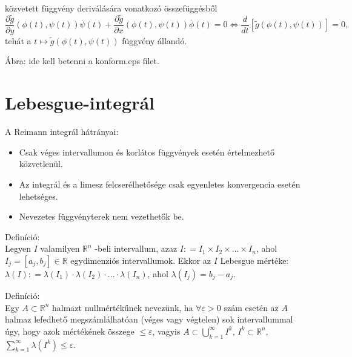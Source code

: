 \documentclass[12pt,a4paper]{scrartcl}
\providecommand{\tightlist}{%
  \setlength{\itemsep}{0pt}\setlength{\parskip}{0pt}}
\newenvironment{definicio}{}{}
\begin{document}
közvetett függvény deriválására vonatkozó összefüggésből
\[\left. \frac{\partial\widetilde{g}}{\partial y}\left( {\phi\left( t \right),\psi\left( t \right)} \right)\overset{.}{\psi}\left( t \right) + \frac{\partial\widetilde{g}}{\partial x}\left( {\phi\left( t \right),\psi\left( t \right)} \right)\overset{.}{\phi}\left( t \right) = 0\Leftrightarrow\frac{d}{dt}\left\lbrack {\widetilde{g}\left( {\phi\left( t \right),\psi\left( t \right)} \right)} \right\rbrack = 0, \right.\]
tehát a
\(\left. t\mapsto\widetilde{g}\left( {\phi\left( t \right),\psi\left( t \right)} \right) \right.\)
függvény állandó.

Ábra: ide kell betenni a konform.eps filet.

\hypertarget{lebesgue-integral}{%
\section{Lebesgue-integrál}\label{lebesgue-integral}}

A Reimann integrál hátrányai:

\begin{itemize}
\tightlist
\item
  Csak véges intervallumon és korlátos függvények esetén értelmezhető
  közvetlenül.
\item
  Az integrál és a limesz felcserélhetősége csak egyenletes konvergencia
  esetén lehetséges.
\item
  Nevezetes függvényterek nem vezethetők be.
\end{itemize}

\begin{definicio}

Definíció:\\
Legyen \(I\) valamilyen \({\mathbb{R}}^{n}\) -beli intervallum, azaz
\(I: = I_{1} \times I_{2} \times ... \times I_{n}\), ahol
\(I_{j} = \left\lbrack {a_{j},b_{j}} \right\rbrack \in {\mathbb{R}}\)
egydimenziós intervallumok. Ekkor az \(I\) Lebesgue mértéke:
\(\lambda\left( I \right): = \lambda\left( I_{1} \right) \cdot \lambda\left( I_{2} \right) \cdot ... \cdot \lambda\left( I_{n} \right)\),
ahol \(\lambda\left( I_{j} \right) = b_{j} - a_{j}\).

\end{definicio}

\begin{definicio}

Definíció:\\
Egy \(A \subset {\mathbb{R}}^{n}\) halmazt nullmértékűnek nevezünk, ha
\(\forall\varepsilon > 0\) szám esetén az \(A\) halmaz lefedhető
megszámlálhatóan (véges vagy végtelen) sok intervallummal úgy, hogy azok
mértékének összege \(\leq \varepsilon\), vagyis
\(A \subset {\bigcup\limits_{k = 1}^{\infty}I^{k}},\, I^{k} \subset {\mathbb{R}}^{n}\),
\({\sum\limits_{k = 1}^{\infty}{\lambda\left( I^{k} \right)}} \leq \varepsilon\).

\end{definicio}
\end{document}
